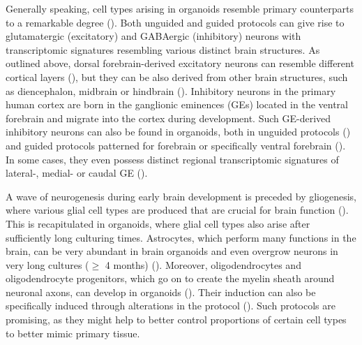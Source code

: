 Generally speaking, cell types arising in organoids resemble primary counterparts to a remarkable degree (\cite{camp_human_2015}). Both unguided and guided protocols can give rise to glutamatergic (excitatory) and GABAergic (inhibitory) neurons with transcriptomic signatures resembling various distinct brain structures. As outlined above, dorsal forebrain-derived excitatory neurons can resemble different cortical layers (\cite{kanton_organoid_2019,qian_sliced_2020}), but they can be also derived from other brain structures, such as diencephalon, midbrain or hindbrain (\cite{kanton_organoid_2019}). 
Inhibitory neurons in the primary human cortex are born in the ganglionic eminences (GEs) located in the ventral forebrain and migrate into the cortex during development. Such GE-derived inhibitory neurons can also be found in organoids, both in unguided protocols (\cite{kanton_organoid_2019}) and guided protocols patterned for forebrain or specifically ventral forebrain (\cite{velasco_individual_2019,birey_assembly_2017,miura_generation_2020}). In some cases, they even possess distinct regional transcriptomic signatures of lateral-, medial- or caudal GE (\cite{kanton_organoid_2019,miura_generation_2020}). 

A wave of neurogenesis during early brain development is preceded by gliogenesis, where various glial cell types are produced that are crucial for brain function (\cite{rowitch_developmental_2010}). This is recapitulated in organoids, where glial cell types also arise after sufficiently long culturing times. Astrocytes, which perform many functions in the brain, can be very abundant in brain organoids and even overgrow neurons in very long cultures ($\geq$ 4 months) (\cite{kanton_organoid_2019,giandomenico_cerebral_2019,sloan_human_2017}). Moreover, oligodendrocytes and oligodendrocyte progenitors, which go on to create the myelin sheath around neuronal axons, can develop in organoids (\cite{tanaka_synthetic_2020}). Their induction can also be specifically induced through alterations in the protocol (\cite{madhavan_induction_2018,marton_differentiation_2019}). Such protocols are promising, as they might help to better control proportions of certain cell types to better mimic primary tissue.

